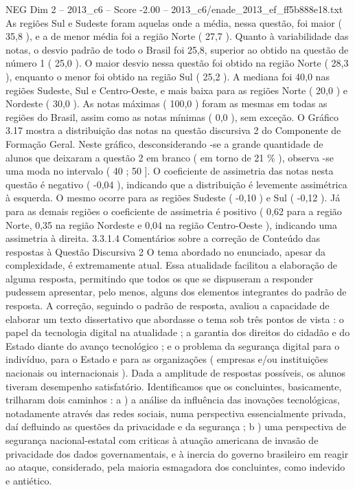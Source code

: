 \begin{textsample}{NEG Dim 2 – 2013\_c6 – Score -2.00 – 2013\_c6/enade\_2013\_ef\_ff5b888e18.txt}
As regiões Sul e Sudeste foram aquelas onde a média, nessa questão, foi maior ( 35,8 ), e a de menor média foi a região Norte ( 27,7 ).
Quanto à variabilidade das notas, o desvio padrão de todo o Brasil foi 25,8, superior ao obtido na questão de número 1 ( 25,0 ).
O maior desvio nessa questão foi obtido na região Norte ( 28,3 ), enquanto o menor foi obtido na região Sul ( 25,2 ).
A mediana foi 40,0 nas regiões Sudeste, Sul e Centro-Oeste, e mais baixa para as regiões Norte ( 20,0 ) e Nordeste ( 30,0 ).
As notas máximas ( 100,0 ) foram as mesmas em todas as regiões do Brasil, assim como as notas mínimas ( 0,0 ), sem exceção.
O Gráfico 3.17 mostra a distribuição das notas na questão discursiva 2 do Componente de Formação Geral.
Neste gráfico, desconsiderando -se a grande quantidade de alunos que deixaram a questão 2 em branco ( em torno de 21 \% ), observa -se uma moda no intervalo ( 40 ; 50 ].
O coeficiente de assimetria das notas nesta questão é negativo ( -0,04 ), indicando que a distribuição é levemente assimétrica à esquerda.
O mesmo ocorre para as regiões Sudeste ( -0,10 ) e Sul ( -0,12 ).
Já para as demais regiões o coeficiente de assimetria é positivo ( 0,62 para a região Norte, 0,35 na região Nordeste e 0,04 na região Centro-Oeste ), indicando uma assimetria à direita. 3.3.1.4 Comentários sobre a correção de Conteúdo das respostas à Questão Discursiva 2 O tema abordado no enunciado, apesar da complexidade, é extremamente atual.
Essa atualidade facilitou a elaboração de alguma resposta, permitindo que todos os que se dispuseram a responder pudessem apresentar, pelo menos, alguns dos elementos integrantes do padrão de resposta.
A correção, seguindo o padrão de resposta, avaliou a capacidade de elaborar um texto dissertativo que abordasse o tema sob três pontos de vista : o papel da tecnologia digital na atualidade ; a garantia dos direitos do cidadão e do Estado diante do avanço tecnológico ; e o problema da segurança digital para o indivíduo, para o Estado e para as organizações ( empresas e/ou instituições nacionais ou internacionais ).
Dada a amplitude de respostas possíveis, os alunos tiveram desempenho satisfatório.
Identificamos que os concluintes, basicamente, trilharam dois caminhos : a ) a análise da influência das inovações tecnológicas, notadamente através das redes sociais, numa perspectiva essencialmente privada, daí defluindo as questões da privacidade e da segurança ; b ) uma perspectiva de segurança nacional-estatal com criticas à atuação americana de invasão de privacidade dos dados governamentais, e à inercia do governo brasileiro em reagir ao ataque, considerado, pela maioria esmagadora dos concluintes, como indevido e antiético.

\end{textsample}
